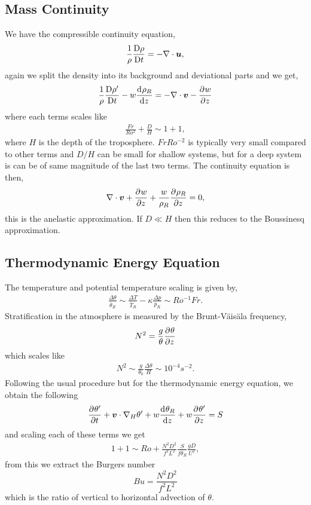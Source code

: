 \subsection{Mass Continuity} 
We have the compressible continuity equation, 
\begin{gather*}
    \frac{1}{\rho}\displaystyle \frac{{\rm D} \rho}{{\rm D} t}=-\nabla\cdot\bm{u},
\end{gather*}
again we split the density into its background and deviational parts and we get,
\begin{gather*}
    \frac{1}{\rho}\displaystyle \frac{{\rm D} \rho'}{{\rm D} t}-w\displaystyle \frac{{\rm d}^{} \rho_R}{{\rm d} z^{}}=-\nabla\cdot\bm{v}-\displaystyle \frac{\partial^{} w}{\partial z^{}}
\end{gather*}
where each terms scales like 
\begin{gather*}
    \frac{Fr}{Ro^2} + \frac{D}{H} \sim 1 + 1,
\end{gather*}
where $H$ is the depth of the troposphere. $FrRo^{-2}$ is typically very small compared to other terms and $D/H$ can be small for shallow systems, but for a deep system is can be of same magnitude of the last two terms. The continuity equation is then,
\begin{gather*}
    \nabla\cdot\bm{v}+\displaystyle \frac{\partial^{} w}{\partial z^{}}+\frac{w}{\rho_R}\displaystyle \frac{\partial^{} \rho_R}{\partial z^{}}=0,
\end{gather*}
this is the anelastic approximation. If $D\ll H$ then this reduces to the Boussinesq approximation.
\subsection{Thermodynamic Energy Equation}
The temperature and potential temperature scaling is given by, 
\begin{gather*}
    \frac{\Delta\theta}{\overline{\theta}_R}\sim\frac{\Delta T}{\overline{T}_R}-\kappa\frac{\Delta p}{\overline{p}_R}\sim Ro^{-1}Fr.
\end{gather*}
Stratification in the atmosphere is measured by the Brunt-V\"ais\"ala frequency, $$N^2=\frac{g}{\theta}\displaystyle \frac{\partial^{} \theta}{\partial z^{}}$$
which scales like 
\begin{gather*}
    N^2\sim\frac{g}{\theta_0}\frac{\Delta\theta}{H}\sim 10^{-4}s^{-2}.
\end{gather*}
Following the usual procedure but for the thermodynamic energy equation, we obtain the following 
\begin{gather*}
    \displaystyle \frac{\partial^{} \theta'}{\partial t^{}}+\bm{v}\cdot\nabla_H\theta'+w\displaystyle \frac{{\rm d}^{} \theta_R}{{\rm d} z^{}}+w\displaystyle \frac{\partial^{} \theta'}{\partial z^{}}=S
\end{gather*}
and scaling each of these terms we get 
\begin{gather*}
    1 + 1 \sim Ro + \frac{N^2D^2}{f^2L^2}\frac{S}{f\overline{\theta}_R}\frac{gD}{U^2},
\end{gather*}
from this we extract the Burgers number $$Bu=\frac{N^2D^2}{f^2L^2}$$ which is the ratio of vertical to horizontal advection of $\theta$.

